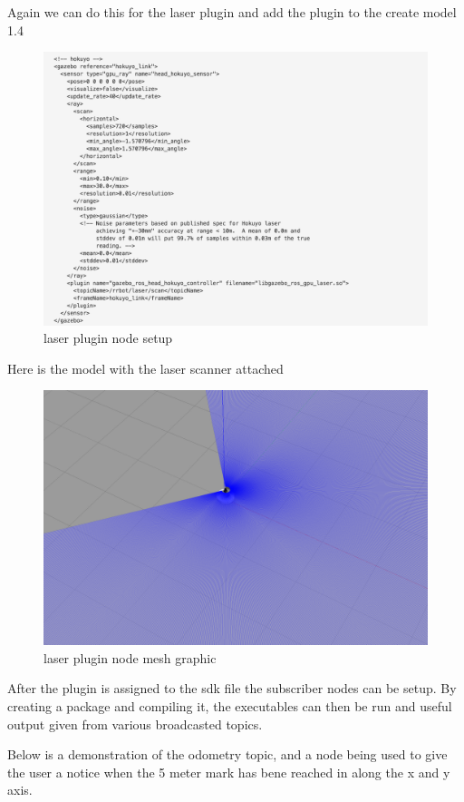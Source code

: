 \documentclass[a4paper, 10pt]{IEEEconf}
\begin{document}
\clearpage
Again we can do this for the laser plugin and add the plugin to the create model 1.4

\begin{figure}[H]
  \includegraphics[width=0.8\linewidth, center]{images/laser}
  \caption{laser plugin node setup}
  \label{fig:laser plugin node setup}
\end{figure}

Here is the model with the laser scanner attached

\begin{figure}[H]
  \includegraphics[width=0.8\linewidth, center]{images/laserdemo}
  \caption{laser plugin node mesh graphic}
  \label{fig:laser plugin node mesh graphic}
\end{figure}

After the plugin is assigned to the sdk file the subscriber nodes can be setup. By creating a package and compiling it, the executables can then be run and useful output given from various broadcasted topics.

\clearpage
Below is a demonstration of the odometry topic, and a node being used to give the user a notice when the 5 meter mark has bene reached in along the x and y axis. 
\end{document}
